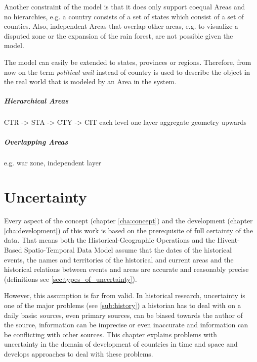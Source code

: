 Another constraint of the model is that it does only support coequal Areas and no hierarchies, e.g. a country consists of a set of states which consist of a set of counties. Also, independent Areas that overlap other areas, e.g. to visualize a disputed zone or the expansion of the rain forest, are not possible given the model.

The model can easily be extended to states, provinces or regions. Therefore, from now on the term \emph{political unit} instead of country is used to describe the object in the real world that is modeled by an Area in the system.


\paragraph{Hierarchical Areas} %
\label{par:hierarchical_areas}

CTR -> STA -> CTY -> CIT
each level one layer
aggregate geometry upwards


\paragraph{Overlapping Areas} %
\label{par:overlapping_areas}

e.g. war zone,
independent layer





\chapter{Uncertainty} %
\label{cha:uncertainty}

Every aspect of the concept (chapter \ref{cha:concept}) and the development (chapter \ref{cha:development}) of this work is based on the prerequisite of full certainty of the data. That means both the Historical-Geographic Operations and the Hivent-Based Spatio-Temporal Data Model assume that the dates of the historical events, the names and territories of the historical and current areas and the historical relations between events and areas are accurate and reasonably precise (definitions see \ref{sec:types_of_uncertainty}).

However, this assumption is far from valid. In historical research, uncertainty is one of the major problems (see \ref{sub:history}) a historian has to deal with on a daily basis: sources, even primary sources, can be biased towards the author of the source, information can be imprecise or even inaccurate and information can be conflicting with other sources. This chapter explains problems with uncertainty in the domain of development of countries in time and space and develops approaches to deal with these problems.


